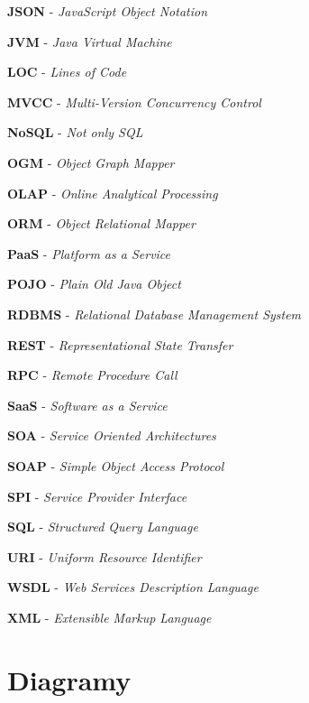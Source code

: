 \documentclass[11pt,twoside,a4paper]{book}
\begin{document}
\textbf{JSON} - \textit{JavaScript Object Notation}

\textbf{JVM} - \textit{Java Virtual Machine}

\textbf{LOC} - \textit{Lines of Code}

\textbf{MVCC} - \textit{Multi-Version Concurrency Control}

\textbf{NoSQL} - \textit{Not only SQL}

\textbf{OGM} - \textit{Object Graph Mapper}

\textbf{OLAP} - \textit{Online Analytical Processing}

\textbf{ORM} - \textit{Object Relational Mapper}

\textbf{PaaS} - \textit{Platform as a Service}

\textbf{POJO} - \textit{Plain Old Java Object}

\textbf{RDBMS} - \textit{Relational Database Management System}

\textbf{REST} - \textit{Representational State Transfer}

\textbf{RPC} - \textit{Remote Procedure Call}

\textbf{SaaS} - \textit{Software as a Service}

\textbf{SOA} - \textit{Service Oriented Architectures}

\textbf{SOAP} - \textit{Simple Object Access Protocol}

\textbf{SPI} - \textit{Service Provider Interface}

\textbf{SQL} - \textit{Structured Query Language}

\textbf{URI} - \textit{Uniform Resource Identifier}

\textbf{WSDL} - \textit{Web Services Description Language}

\textbf{XML} - \textit{Extensible Markup Language}


\chapter{Diagramy}
\end{document}
